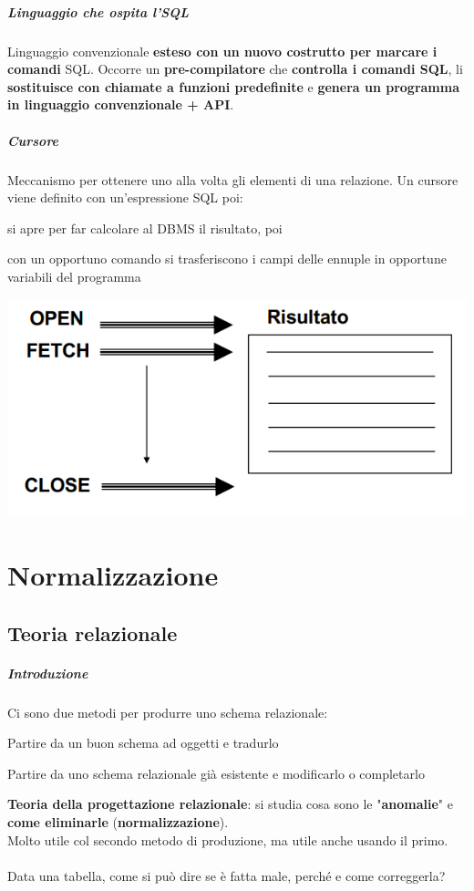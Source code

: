 \documentclass[10pt]{book}
\begin{document}
\paragraph{Linguaggio che ospita l'SQL} Linguaggio convenzionale \textbf{esteso con un nuovo costrutto per marcare i comandi} SQL. Occorre un \textbf{pre-compilatore} che \textbf{controlla i comandi SQL}, li \textbf{sostituisce con chiamate a funzioni predefinite} e \textbf{genera un programma in linguaggio convenzionale + API}.
\paragraph{Cursore} Meccanismo per ottenere uno alla volta gli elementi di una relazione. Un cursore viene definito con un'espressione SQL poi:
\begin{list}{}{}
	\item si apre per far calcolare al DBMS il risultato, poi
	\item con un opportuno comando si trasferiscono i campi delle ennuple in opportune variabili del programma
\end{list}
\begin{center}
	\includegraphics[scale=0.5]{cursore.png}
\end{center}
\chapter{Normalizzazione}
\section{Teoria relazionale}
\paragraph{Introduzione} Ci sono due metodi per produrre uno schema relazionale:
\begin{list}{}{}
	\item Partire da un buon schema ad oggetti e tradurlo
	\item Partire da uno schema relazionale già esistente e modificarlo o completarlo
\end{list}
\textbf{Teoria della progettazione relazionale}: si studia cosa sono le "\textbf{anomalie}" e \textbf{come eliminarle} (\textbf{normalizzazione}).\\
Molto utile col secondo metodo di produzione, ma utile anche usando il primo.\\\\
Data una tabella, come si può dire se è fatta male, perché e come  correggerla?
\end{document}
